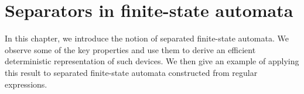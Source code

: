 \chapter{Separators in finite-state automata}
\label{chapter:separators_finite_state_automata}

In this chapter, we introduce the notion of separated finite-state automata. We
observe some of the key properties and use them to derive an efficient deterministic
representation of such devices. We then give an example of applying this result to
separated finite-state automata constructed from regular expressions.






